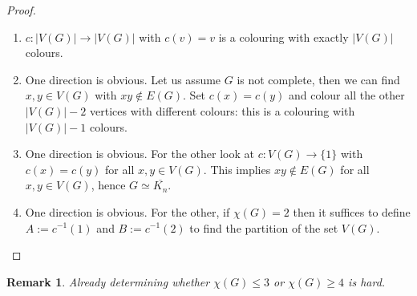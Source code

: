 \documentclass[a4paper]{article}
\theoremstyle{plain}
\theoremstyle{myremark}
\newtheorem{remark}[lemma]{Remark}
\begin{document}
\begin{proof}
\begin{enumerate}
\item $c: |V(G)| \longrightarrow  |V(G)|$ with $c(v)=v$ is a colouring with exactly $|V(G)|$ colours.
\item One direction is obvious. Let us assume $G$ is not complete, then we can find $x,y\in V(G)$ with $xy\notin E(G)$. Set $c(x)=c(y)$ and colour all the other $|V(G)|-2$ vertices with different colours: this is a colouring with $|V(G)|-1$ colours.
\item One direction is obvious. For the other look at $c:V(G)\longrightarrow \{1\}$ with $c(x)=c(y)$ for all $x,y\in V(G)$. This implies $xy\notin E(G)$ for all $x,y\in V(G)$, hence $G \simeq \overline{K_n}$.
\item One direction is obvious. For the other, if $\chi(G)=2$ then it suffices to define $A:=c^{-1}(1)$ and $B:=c^{-1}(2)$ to find the partition of the set $V(G)$.
\end{enumerate}
\end{proof}

\begin{remark}
Already determining whether $\chi(G)\leqslant 3$ or $\chi(G)\geqslant 4$ is hard.
\end{remark}
\end{document}

